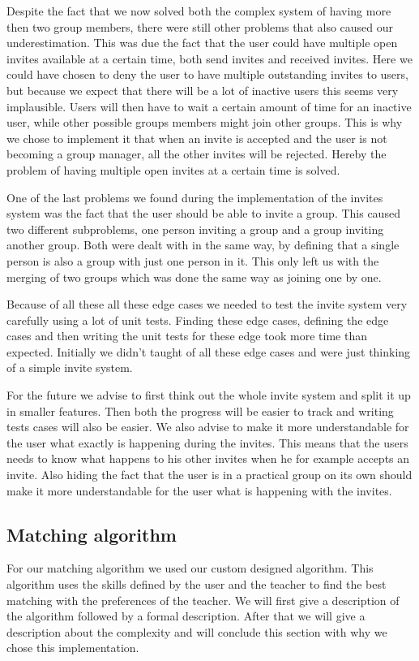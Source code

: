 Despite the fact that we now solved both the complex system of having more then two group members, there were still other problems that also caused our underestimation.
This was due the fact that the user could have multiple open invites available at a certain time, both send invites and received invites.
Here we could have chosen to deny the user to have multiple outstanding invites to users, but because we expect that there will be a lot of inactive users this seems very implausible.
Users will then have to wait a certain amount of time for an inactive user, while other possible groups members might join other groups.
This is why we chose to implement it that when an invite is accepted and the user is not becoming a group manager, all the other invites will be rejected.
Hereby the problem of having multiple open invites at a certain time is solved.

One of the last problems we found during the implementation of the invites system was the fact that the user should be able to invite a group.
This caused two different subproblems, one person inviting a group and a group inviting another group.
Both were dealt with in the same way, by defining that a single person is also a group with just one person in it.
This only left us with the merging of two groups which was done the same way as joining one by one.

Because of all these all these edge cases we needed to test the invite system very carefully using a lot of unit tests.
Finding these edge cases, defining the edge cases and then writing the unit tests for these edge took more time than expected.
Initially we didn't taught of all these edge cases and were just thinking of a simple invite system.

For the future we advise to first think out the whole invite system and split it up in smaller features.
Then both the progress will be easier to track and writing tests cases will also be easier.
We also advise to make it more understandable for the user what exactly is happening during the invites.
This means that the users needs to know what happens to his other invites when he for example accepts an invite.
Also hiding the fact that the user is in a practical group on its own should make it more understandable for the user what is happening with the invites.

\subsection{Matching algorithm}
\label{sec:algorithm}
For our matching algorithm we used our custom designed algorithm.
This algorithm uses the skills defined by the user and the teacher to find the best matching with the preferences of the teacher.
We will first give a description of the algorithm followed by a formal description.
After that we will give a description about the complexity and will conclude this section with why we chose this implementation.

